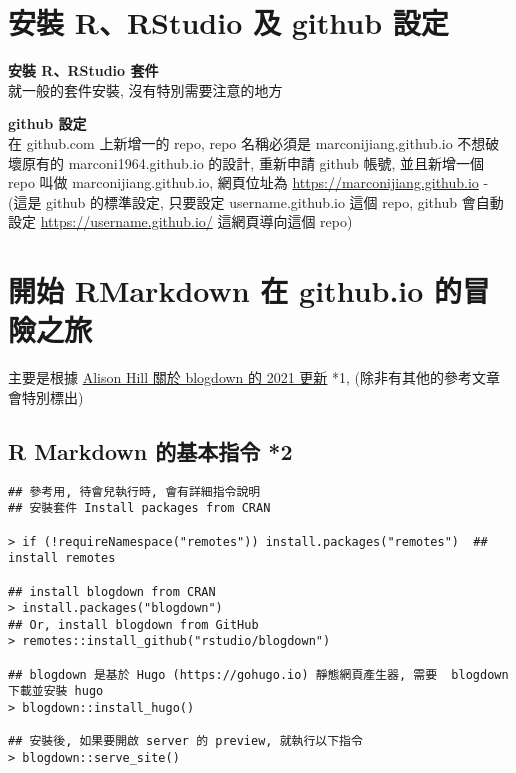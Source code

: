 \documentclass[
]{book}
\begin{document}
\hypertarget{intro}{%
\chapter{安裝 R、RStudio 及 github 設定}\label{intro}}

\textbf{安裝 R、RStudio 套件}\\
就一般的套件安裝, 沒有特別需要注意的地方

\textbf{github 設定}\\
在 github.com 上新增一的 repo, repo 名稱必須是 marconijiang.github.io
不想破壞原有的 marconi1964.github.io 的設計, 重新申請 github 帳號, 並且新增一個 repo 叫做 marconijiang.github.io, 網頁位址為 \url{https://marconijiang.github.io}
- (這是 github 的標準設定, 只要設定 username.github.io 這個 repo, github 會自動設定 \url{https://username.github.io/} 這網頁導向這個 repo)

\hypertarget{ux958bux59cb-rmarkdown-ux5728-github.io-ux7684ux5192ux96aaux4e4bux65c5}{%
\chapter{開始 RMarkdown 在 github.io 的冒險之旅}\label{ux958bux59cb-rmarkdown-ux5728-github.io-ux7684ux5192ux96aaux4e4bux65c5}}

主要是根據 \href{https://alison.rbind.io/post/new-year-new-blogdown/}{Alison Hill 關於 blogdown 的 2021 更新} *1, (除非有其他的參考文章會特別標出)

\hypertarget{r-markdown-ux7684ux57faux672cux6307ux4ee4-2}{%
\section{R Markdown 的基本指令 *2}\label{r-markdown-ux7684ux57faux672cux6307ux4ee4-2}}

\begin{verbatim}
## 參考用, 待會兒執行時, 會有詳細指令說明
## 安裝套件 Install packages from CRAN

> if (!requireNamespace("remotes")) install.packages("remotes")  ## install remotes

## install blogdown from CRAN
> install.packages("blogdown") 
## Or, install blogdown from GitHub
> remotes::install_github("rstudio/blogdown")

## blogdown 是基於 Hugo (https://gohugo.io) 靜態網頁產生器, 需要  blogdown 下載並安裝 hugo
> blogdown::install_hugo()

## 安裝後, 如果要開啟 server 的 preview, 就執行以下指令
> blogdown::serve_site()
\end{verbatim}
\end{document}
